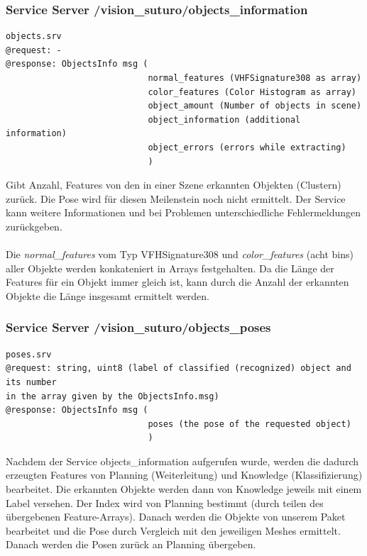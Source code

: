 \documentclass{suturo}
\begin{document}
\subsubsection{Service Server /vision\_suturo/objects\_information}
\begin{verbatim}
objects.srv
@request: -
@response: ObjectsInfo msg (
							normal_features (VHFSignature308 as array)
							color_features (Color Histogram as array)
							object_amount (Number of objects in scene)
							object_information (additional information)
							object_errors (errors while extracting)
							)
\end{verbatim}
Gibt Anzahl, Features von den in einer Szene erkannten Objekten (Clustern) zurück. Die Pose wird für diesen Meilenstein noch nicht ermittelt. Der Service kann weitere Informationen und bei Problemen unterschiedliche Fehlermeldungen zurückgeben.
\\ \\
Die \textit{normal\_features} vom Typ VFHSignature308 und \textit{color\_features} (acht bins) aller Objekte werden konkateniert in Arrays festgehalten. 
Da die Länge der Features für ein Objekt immer gleich ist, kann durch die Anzahl der erkannten Objekte die Länge insgesamt ermittelt werden.

\subsubsection{Service Server /vision\_suturo/objects\_poses}

\begin{figure}[!htb]
\end{figure}


\begin{verbatim}
poses.srv
@request: string, uint8 (label of classified (recognized) object and its number
in the array given by the ObjectsInfo.msg)
@response: ObjectsInfo msg (
							poses (the pose of the requested object)
							)
\end{verbatim}
Nachdem der Service objects\_information aufgerufen wurde, werden die dadurch erzeugten Features von Planning (Weiterleitung) und Knowledge (Klassifizierung) bearbeitet. Die erkannten Objekte werden dann von Knowledge jeweils mit einem Label versehen. Der Index wird von Planning bestimmt (durch teilen des übergebenen Feature-Arrays). Danach werden die Objekte von unserem Paket bearbeitet und die Pose durch Vergleich mit den jeweiligen Meshes ermittelt. Danach werden die Posen zurück an Planning übergeben.
\end{document}
